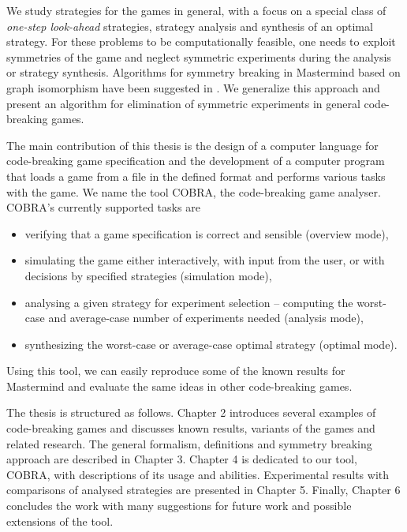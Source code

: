 We study strategies for the games in general, with a focus on
  a special class of \emph{one-step look-ahead} strategies,
  strategy analysis and synthesis of an optimal strategy.
For these problems to be computationally feasible, one needs to exploit
  symmetries of the game and neglect symmetric experiments during the analysis
  or strategy synthesis.
Algorithms for symmetry breaking in Mastermind
  based on graph isomorphism have been suggested in \cite{cbg-nauty}.
We generalize this approach and present
  an algorithm for elimination of symmetric experiments
  in general code-breaking games.

The main contribution of this thesis is the design of a computer language for
  code-breaking game specification
  and the development of a computer program that
  loads a game from a file in the defined format
  and performs various tasks with the game.
We name the tool COBRA, the code-breaking game analyser.
COBRA's currently supported tasks are
\begin{itemize}
\item verifying that a game specification is correct
  and sensible (overview mode),
\item simulating the game either interactively, with input from the user, or
  with decisions by specified strategies (simulation mode),
\item analysing a given strategy for experiment selection --
  computing the worst-case and average-case number of experiments needed (analysis mode),
\item synthesizing the worst-case or average-case optimal strategy (optimal mode).
\end{itemize}
Using this tool, we can easily reproduce some of the known results
  for Mastermind and evaluate the same ideas in other code-breaking games.

The thesis is structured as follows.
Chapter 2 introduces several examples of code-breaking games and
  discusses known results, variants of the games and related research.
The general formalism, definitions and symmetry breaking approach
  are described in Chapter 3.
Chapter 4 is dedicated to our tool, COBRA, with descriptions of its usage and
  abilities.
Experimental results with comparisons of analysed strategies
  are presented in Chapter 5.
Finally, Chapter 6 concludes the work with many suggestions for future work
  and possible extensions of the tool.






